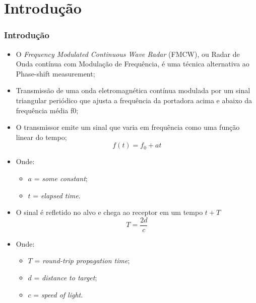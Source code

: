 \documentclass[xcolor=dvipsnames, aspectratio=169]{beamer}
\begin{document}
\section[Introdução]{Introdução} 
\begin{frame}
\frametitle{Introdução}
	\begin{itemize}
		\item O \textit{Frequency Modulated Continuous Wave Radar} (FMCW), ou Radar de Onda contínua com Modulação de Frequência, é uma técnica alternativa ao Phase-shift measurement;
		\item Transmissão de uma onda eletromagnética contínua modulada por um sinal triangular periódico que ajusta a frequência da portadora acima e abaixo da frequência média f0;
		\item O transmissor emite um sinal que varia em frequência como uma função linear do tempo;
		\begin{equation}
            f(t) = f_0 + at
        \end{equation}
        \item Onde:
        \begin{itemize}
            \item $a$ = \textit{some constant};
            \item $t$ = \textit{elapsed time}.
        \end{itemize}
        \item O sinal é refletido no alvo e chega ao receptor em um tempo $t + T$
        \begin{equation}
            T = \frac{2d}{c}
        \end{equation}
        \item Onde:
        \begin{itemize}
            \item $T$ = \textit{round-trip propagation time};
            \item $d$ = \textit{distance to target};
            \item $c$ = \textit{speed of light}.
        \end{itemize}
        \begin{figure}
            \centering

\end{figure}
\end{itemize}
\end{frame}
\end{document}
